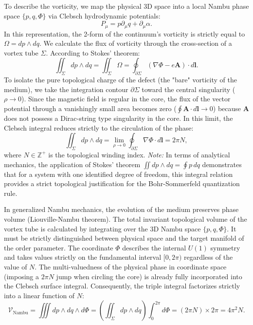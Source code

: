 \documentclass[11pt,a4paper]{article}
\begin{document}
To describe the vorticity, we map the physical 3D space into a local Nambu phase space $\{p, q, \Phi\}$ via Clebsch hydrodynamic potentials:
\begin{equation}
	P_\mu = p \partial_\mu q + \partial_\mu \alpha.
\end{equation}
In this representation, the 2-form of the continuum's vorticity is strictly equal to $\Omega = dp \wedge dq$.
We calculate the flux of vorticity through the cross-section of a vortex tube $\Sigma$. According to Stokes' theorem:
\begin{equation}
	\iint_\Sigma dp \wedge dq = \iint_\Sigma \Omega = \oint_{\partial \Sigma} (\nabla \Phi - e \mathbf{A}) \cdot d\mathbf{l}.
\end{equation}
To isolate the pure topological charge of the defect (the "bare" vorticity of the medium), we take the integration contour $\partial \Sigma$ toward the central singularity ($\rho \to 0$). Since the magnetic field is regular in the core, the flux of the vector potential through a vanishingly small area becomes zero ($\oint \mathbf{A} \cdot d\mathbf{l} \to 0$) because $\mathbf{A}$ does not possess a Dirac-string type singularity in the core. In this limit, the Clebsch integral reduces strictly to the circulation of the phase:
\begin{equation}
	\iint_\Sigma dp \wedge dq = \lim_{\rho \to 0} \oint_{\partial \Sigma} \nabla \Phi \cdot d\mathbf{l} = 2\pi N,
\end{equation}
where $N \in \mathbb{Z}^+$ is the topological winding index.
\textit{Note:} In terms of analytical mechanics, the application of Stokes' theorem $\iint dp \wedge dq = \oint p \, dq$ demonstrates that for a system with one identified degree of freedom, this integral relation provides a strict topological justification for the Bohr-Sommerfeld quantization rule.

In generalized Nambu mechanics, the evolution of the medium preserves phase volume (Liouville-Nambu theorem). The total invariant topological volume of the vortex tube is calculated by integrating over the 3D Nambu space $\{p, q, \Phi\}$.
It must be strictly distinguished between physical space and the target manifold of the order parameter. The coordinate $\Phi$ describes the internal $U(1)$ symmetry and takes values strictly on the fundamental interval $[0, 2\pi)$ regardless of the value of $N$. The multi-valuedness of the physical phase in coordinate space (imposing a $2\pi N$ jump when circling the core) is already fully incorporated into the Clebsch surface integral. Consequently, the triple integral factorizes strictly into a linear function of $N$:
\begin{equation}
	\mathcal{V}_{\text{Nambu}} = \iiint dp \wedge dq \wedge d\Phi = \left( \iint_\Sigma dp \wedge dq \right) \int_0^{2\pi} d\Phi = (2\pi N) \times 2\pi = 4\pi^2 N.
\end{equation}
\end{document}
